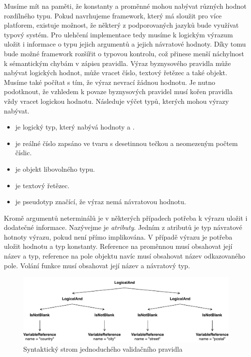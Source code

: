 Musíme mít na paměti, že konstanty a proměnné mohou nabývat různých hodnot rozdílného typu.
Pokud navrhujeme framework, který má sloužit pro více platforem,
existuje možnost, že některý z podporovaných jazyků bude využívat typový systém.
Pro ulehčení implementace tedy musíme k logickým výrazum uložit i
informace o typu jejich argumentů a jejich návratové hodnoty.
Díky tomu bude možné framework rozšířit o typovou kontrolu, což přinese menší náchylnost
k sémantickým chybám v zápisu pravidla. Výraz byznysového pravidla
může nabývat logických hodnot, může vracet číslo, textový řetězec a také objekt. Musíme také
počítat s tím, že výraz nevrací žádnou hodnotu. Je nutno podotknout, že vzhledem k povaze
byznysových pravidel musí kořen pravidla vždy vracet logickou hodnotu. Následuje výčet typů,
kterých mohou výrazy nabývat.

\begin{itemize}
    \item {} je logický typ, který nabývá hodnoty  a .
    \item {} je reálné číslo zapsáno ve tvaru s desetinnou tečkou a neomezeným počtem číslic.
    \item {} je objekt libovolného typu.
    \item {} je textový řetězec.
    \item {} je pseudotyp značící, že výraz nemá návratovou hodnotu.
\end{itemize}

Kromě argumentů neterminálů je v některých případech potřeba k výrazu uložit i dodatečné informace.
Nazývejme je \textit{atributy}. Jedním z atributů je typ návratové hotnoty výrazu, pokud není přímo implikována.
V případě výrazu  je potřeba uložit hodnotu a typ konstanty. Reference na proměnnou
musí obsahovat její název a typ, reference na pole objektu navíc musí obsahovat název odkazovaného pole.
Volání funkce musí obsahovat její název a návratový typ.

\begin{figure}
    \centering
    \includegraphics[keepaspectratio=true, width=1\linewidth]{figures/simple-rule.pdf}
    \caption{Syntaktický strom jednoduchého validačního pravidla}
    \label{fig:simple-rule}
\end{figure}

